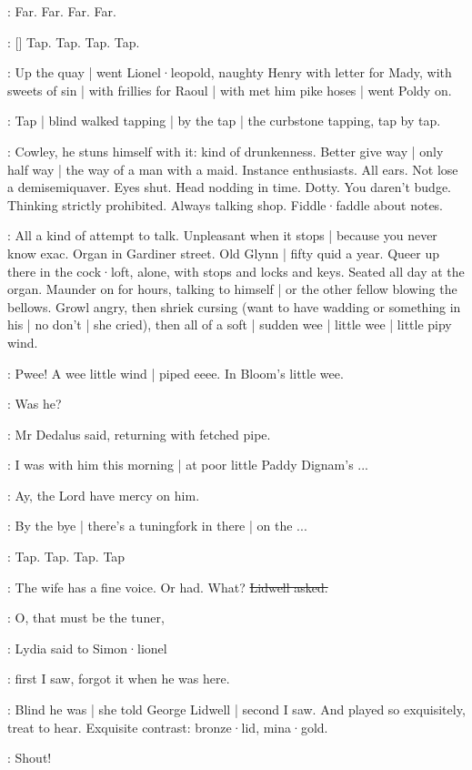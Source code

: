 :
Far.
Far.
Far.
Far.

\stripling:
[]
Tap.
Tap.
Tap.
Tap.

:
Up the quay |
went Lionel·leopold,
naughty Henry with letter for Mady,
with sweets of sin |
with frillies for Raoul |
with met him pike hoses |
went Poldy on.

:
Tap |
blind walked
tapping |
by the tap |
the curbstone tapping,
tap by tap.

\BloomIntA:
Cowley,
he stuns himself with it:
kind of drunkenness.
Better give way |
only half way |
the way of a man with a maid.
Instance enthusiasts.
All ears.
Not lose a demisemiquaver.
Eyes shut.
Head nodding in time.
Dotty.
You daren't budge.
Thinking strictly prohibited.
Always talking shop.
Fiddle·faddle about notes.

\BloomIntB:
All a kind of attempt to talk.
Unpleasant when it stops |
because you never know exac.
Organ in Gardiner street.
Old Glynn |
fifty quid a year.
Queer up there in the cock·loft,
alone,
with stops and locks and keys.
Seated all day at the organ.
Maunder on for hours,
talking to himself |
or the other fellow blowing the bellows.
Growl angry,
then shriek cursing
(want to have wadding or something in his |
no don't |
she cried),
then all of a soft |
sudden wee |
little wee |
little pipy wind.

:
Pwee!
A wee little wind |
piped eeee.
In Bloom's little wee.

\simon:
Was he?

:
Mr Dedalus said,
returning with fetched pipe.

\simon:
I was with him this morning |
at poor little Paddy Dignam's ...

\lidwell:
Ay,
the Lord have mercy on him.

\simon:
By the bye |
there's a tuningfork in there |
on the ...

\stripling:
Tap.
Tap.
Tap.
Tap

\lidwell:
The wife has a fine voice.
Or had.
What?
\sout{Lidwell asked.}

\MissD:
O,
that must be the tuner,

:
Lydia said to Simon·lionel

\MissD:
first I saw,
forgot it when he was here.

:
Blind he was |
she told George Lidwell |
second I saw.
And played so exquisitely,
treat to hear.
Exquisite contrast:
bronze·lid,
mina·gold.

\dollard:
Shout!

